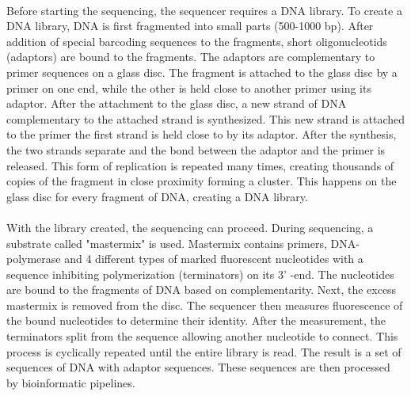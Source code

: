 \paragraph*{}
Before starting the sequencing, the sequencer requires a DNA library. To create a DNA library, DNA is first fragmented into small parts (500-1000 bp). After addition of special barcoding sequences to the fragments, short oligonucleotids (adaptors) are bound to the fragments. The adaptors are complementary to primer sequences on a glass disc. The fragment is attached to the glass disc by a primer on one end, while the other is held close to another primer using its adaptor. After the attachment to the glass disc, a new strand of DNA complementary to the attached strand is synthesized. This new strand is attached to the primer the first strand is held close to by its adaptor. After the synthesis, the two strands separate and the bond between the adaptor and the primer is released. This form of replication is repeated many times, creating thousands of copies of the fragment in close proximity forming a cluster. This happens on the glass disc for every fragment of DNA, creating a DNA library.
\paragraph*{}
With the library created, the sequencing can proceed. During sequencing, a substrate called "mastermix" is used. Mastermix contains primers, DNA-polymerase and 4 different types of marked fluorescent nucleotides with a sequence inhibiting polymerization (terminators) on its 3' -end. The nucleotides are bound to the fragments of DNA based on complementarity. Next, the excess mastermix is removed from the disc. The sequencer then measures fluorescence of the bound nucleotides to determine their identity. After the measurement, the terminators split from the sequence allowing another nucleotide to connect. This process is cyclically repeated until the entire library is read. The result is a set of sequences of DNA with adaptor sequences. These sequences are then processed by bioinformatic pipelines.
